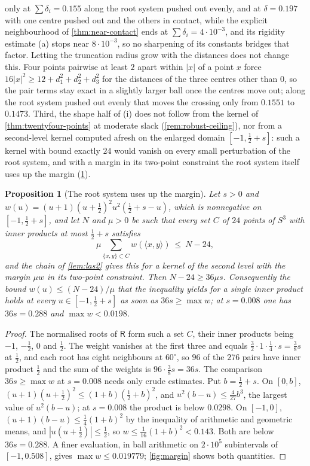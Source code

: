 \documentclass[11pt,reqno]{amsart}
\renewcommand{\_}{\origunderscore\allowbreak}
\numberwithin{equation}{section}
\theoremstyle{plain}
\newtheorem{prop}[thm]{Proposition}
\theoremstyle{definition}
\theoremstyle{remark}
\newcommand{\Rt}{\mathsf{R}}                 %
\begin{document}
only at $\sum\delta_i=0.155$ along the root system pushed out evenly, and
at $\delta=0.197$ with one centre pushed out and the others in contact,
while the explicit neighbourhood of \cref{thm:near-contact} ends at
$\sum\delta_i=4\cdot10^{-3}$, and its rigidity estimate (a) stops near
$8\cdot10^{-3}$, so no sharpening of its constants bridges that factor. Letting the truncation radius grow with the distances does
not change this. Four points pairwise at least $2$ apart within $|x|$ of a
point $x$ force $16|x|^2\ge12+d_1^2+d_2^2+d_3^2$ for the distances of the
three centres other than $0$, so the pair terms stay exact in a slightly
larger ball once the centres move out; along the root system pushed out
evenly that moves the crossing only from $0.1551$ to $0.1473$.
Third, the shape half of (i) does not follow from the kernel of
\cref{thm:twentyfour-points} at moderate slack (\cref{rem:robust-ceiling}),
nor from a second-level kernel computed afresh on the enlarged domain
$[-1,\tfrac12+s]$: such a kernel with bound exactly $24$ would vanish on
every small perturbation of the root system, and with a margin in its
two-point constraint the root system itself uses up the margin
(\cref{prop:margin-floor}).

\begin{prop}[The root system uses up the margin]\label{prop:margin-floor}
Let $s>0$ and $w(u)=(u+1)(u+\tfrac12)^2u^2(\tfrac12+s-u)$, which is
nonnegative on $[-1,\tfrac12+s]$, and let $N$ and $\mu>0$ be such that
every set $C$ of $24$ points of $S^3$ with inner products at most
$\tfrac12+s$ satisfies
\[
  \mu\sum_{\{x,y\}\subset C}w(\langle x,y\rangle)\ \le\ N-24 ,
\]
and the chain of \cref{lem:las2} gives this for a kernel of the
second level with the margin $\mu w$ in its two-point constraint. Then
$N-24\ge36\mu s$. Consequently the bound $w(u)\le(N-24)/\mu$ that the
inequality yields for a single inner product holds at every
$u\in[-1,\tfrac12+s]$ as soon as $36s\ge\max w$; at $s=0.008$ one has
$36s=0.288$ and $\max w<0.0198$.
\end{prop}

\begin{proof}
The normalised roots of $\Rt$ form such a set $C$, their inner products
being $-1$, $-\tfrac12$, $0$ and $\tfrac12$. The weight vanishes at the
first three and equals $\tfrac32\cdot1\cdot\tfrac14\cdot s=\tfrac38s$ at
$\tfrac12$, and each root has eight neighbours at $60^\circ$, so $96$ of
the $276$ pairs have inner product $\tfrac12$ and the sum of the weights
is $96\cdot\tfrac38s=36s$. The comparison $36s\ge\max w$ at $s=0.008$
needs only crude estimates. Put $b=\frac12+s$. On $[0,b]$,
$(u+1)(u+\frac12)^2\le(1+b)(\frac12+b)^2$, and $u^2(b-u)\le\frac4{27}b^3$,
the largest value of $u^2(b-u)$; at $s=0.008$ the product is below
$0.0298$. On $[-1,0]$, $(u+1)(b-u)\le\frac14(1+b)^2$ by the inequality of
arithmetic and geometric means, and $|u(u+\frac12)|\le\frac12$, so
$w\le\frac1{16}(1+b)^2<0.143$. Both are below $36s=0.288$. A finer
evaluation, in ball arithmetic on $2\cdot10^5$ subintervals of
$[-1,0.508]$, gives $\max w\le0.019779$; \cref{fig:margin} shows both
quantities.
\end{proof}
\end{document}
